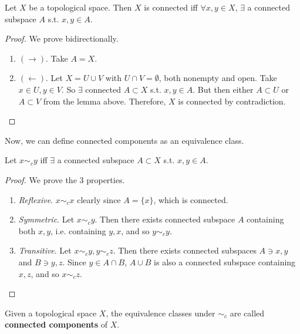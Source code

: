   \begin{theorem}
    Let $X$ be a topological space. Then $X$ is connected iff $\forall x, y \in X$, $\exists$ a connected subspace $A$ s.t. $x, y \in A$. 
  \end{theorem}
  \begin{proof}
    We prove bidirectionally. 
    \begin{enumerate}
      \item $(\rightarrow)$. Take $A = X$. 
      \item $(\leftarrow)$. Let $X = U \cup V$ with $U \cap V = \emptyset$, both nonempty and open. Take $x \in U, y \in V$. So $\exists$ connected $A \subset X$ s.t. $x, y \in A$. But then either $A \subset U$ or $A \subset V$ from the lemma above. Therefore, $X$ is connected by contradiction. 
    \end{enumerate}
  \end{proof}

  Now, we can define connected components as an equivalence class. 

  \begin{corollary}
    Let $x \sim_c y$ iff $\exists$ a connected subspace $A \subset X$ s.t. $x, y \in A$. 
  \end{corollary}
  \begin{proof}
    We prove the 3 properties. 
    \begin{enumerate}
      \item \textit{Reflexive}. $x \sim_c x$ clearly since $A = \{x\}$, which is connected. 
      \item \textit{Symmetric}. Let $x \sim_c y$. Then there exists connected subspace $A$ containing both $x, y$, i.e. containing $y, x$, and so $y \sim_c y$. 
      \item \textit{Transitive}. Let $x \sim_c y, y \sim_c z$. Then there exists connected subspaces $A \ni x, y$ and $B \ni y, z$. Since $y \in A \cap B$, $A \cup B$ is also a connected subspace containing $x, z$, and so $x \sim_c z$. 
    \end{enumerate}
  \end{proof}

  \begin{definition}
    Given a topological space $X$, the equivalence classes under $\sim_c$ are called \textbf{connected components} of $X$. 
  \end{definition}

